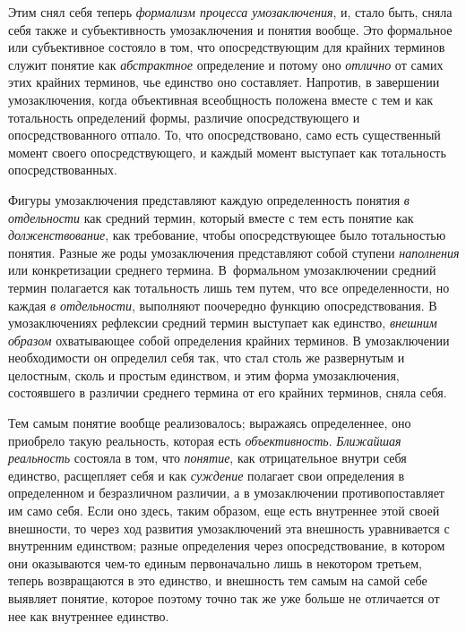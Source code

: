 {{Этим снял себя теперь {\em формализм процесса умозаключения},
и, стало быть, сняла себя также и субъективность
умозаключения и понятия вообще. Это формальное или субъективное состояло в
том, что опосредствующим для крайних терминов служит понятие как
{\em абстрактное} определение и потому оно {\em отлично} от самих
этих крайних терминов, чье единство оно составляет. Напротив, в завершении
умозаключения, когда объективная всеобщность положена вместе с тем и как
тотальность определений формы, различие опосредствующего и
опосредствованного отпало. То, что опосредствовано, само есть существенный
момент своего опосредствующего, и каждый момент выступает как тотальность
опосредствованных.

Фигуры умозаключения представляют каждую определенность
понятия {\em в отдельности}
как средний термин, который вместе с тем есть понятие как
{\em долженствование},
как требование, чтобы опосредствующее было тотальностью
понятия. Разные же роды умозаключения представляют собой ступени
{\em наполнения} или
конкретизации среднего термина. В~формальном умозаключении средний термин
полагается как тотальность лишь тем путем, что все определенности, но
каждая {\em в отдельности},
выполняют поочередно функцию опосредствования. В
умозаключениях рефлексии средний термин выступает как единство,
{\em внешним образом} охватывающее собой определения крайних терминов. В
умозаключении необходимости он определил себя так, что стал столь же
развернутым и целостным, сколь и простым единством, и этим форма
умозаключения, состоявшего в различии среднего термина от его крайних
терминов, сняла себя.

Тем самым понятие вообще реализовалось; выражаясь
определеннее, оно приобрело такую реальность, которая есть
{\em объективность}. {\em Ближайшая реальность} состояла в том, что
{\em понятие}, как отрицательное внутри себя единство, расщепляет себя и как
{\em суждение} полагает
свои определения в определенном и безразличном различии, а в умозаключении
противопоставляет им само себя. Если оно здесь, таким образом, еще есть
внутреннее этой своей внешности, то через ход развития умозаключений эта
внешность уравнивается с внутренним единством; разные определения через
опосредствование, в котором они оказываются чем-то единым первоначально
лишь в некотором третьем, теперь возвращаются в это единство, и внешность
тем самым на самой себе выявляет понятие, которое поэтому точно так же уже
больше не отличается от нее как внутреннее единство.

}}
